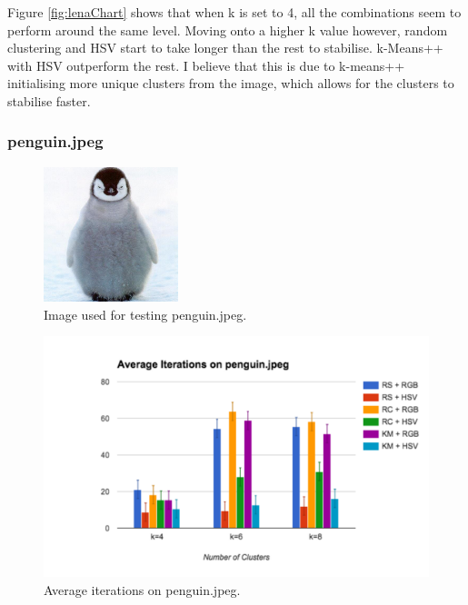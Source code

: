 \documentclass{article}
\begin{document}
Figure \ref{fig:lenaChart} shows that when k is set to 4, all the combinations
seem to perform around the same level. Moving onto a higher k value however,
random clustering and HSV start to take longer than the rest to
stabilise. k-Means++ with HSV outperform the rest. I believe that this is due to
k-means++ initialising more unique clusters from the image, which allows for the
clusters to stabilise faster.

\subsubsection{penguin.jpeg}

\begin{figure}[!ht]
\begin{center}
\includegraphics[width=0.35\textwidth]{images/penguin}
\caption{Image used for testing penguin.jpeg.}
\label{fig:penguinTest}
\end{center}
\end{figure}

\begin{figure}[!ht]
\begin{center}
\includegraphics[width=1\textwidth]{images/penguinChart}
\caption{Average iterations on penguin.jpeg.}
\label{fig:penguinChart}
\end{center}
\end{figure}
\end{document}
